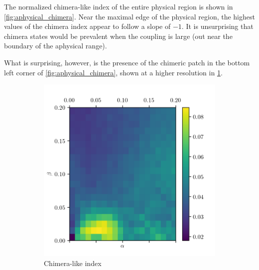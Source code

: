 The normalized chimera-like index of the entire physical region is shown in \cref{fig:aphysical_chimera}.
Near the maximal edge of the physical region, the highest values of the chimera index appear to follow a slope of $-1$.
It is unsurprising that chimera states would be prevalent when the coupling is large (out near the boundary of the aphysical range).

What is surprising, however, is the presence of the chimeric patch in the bottom left corner of \cref{fig:aphysical_chimera}, shown at a higher resolution in \cref{fig:zoom_chimera}.
\begin{figure}[ht]
  \centering
  \begin{subfigure}{0.45\textwidth}
    \centering
    \includegraphics[width=\textwidth]{figure/zoom_chimera}
    \caption{Chimera-like index}
    \label{fig:zoom_chimera}
  \end{subfigure}%
  \begin{subfigure}{0.45\textwidth}
    \centering

\end{subfigure}
\end{figure}
